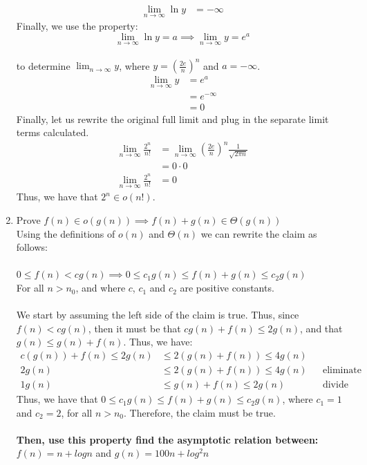 \documentclass{article}
\begin{document}
\begin{enumerate}
\begin{align}
		\lim_{n\to\infty} \ln y &= -\infty
	\end{align}
	Finally, we use the property:
	$$\lim_{n\to\infty} \ln y = a \implies \lim_{n\to\infty} y = e^a$$
	\\ to determine $\lim_{n\to\infty} y$, where $y=(\frac{2e}{n})^n$ and $a=-\infty$.
	\begin{align}
		\lim_{n\to\infty} y &= e^a \\
		&= e^{-\infty} \\
		&= 0
	\end{align}
	Finally, let us rewrite the original full limit and plug in the separate limit terms calculated.
	\begin{align}
		\lim_{n\to\infty} \frac{2^n}{n!} &= \lim_{n\to\infty} (\frac{2e}{n})^n \frac{1}{\sqrt{2\pi n}} \\
		&= 0 \cdot 0 \\
		\lim_{n\to\infty}\frac{2^n}{n!} &= 0
	\end{align}
	Thus, we have that $2^n \in o(n!)$.
	\item Prove $f(n) \in o(g(n)) \implies f(n) + g(n) \in \Theta(g(n))$
	\\ Using the definitions of $o(n)$ and $\Theta(n)$ we can rewrite the claim as follows:
	\\	
	\\$0 \leq f(n) < c g(n) \implies 0 \leq c_1g(n) \leq f(n) + g(n) \leq c_2 g(n)$
	\\ For all $n>n_0$, and where $c$, $c_1$ and $c_2$ are positive constants. 
	\\ \\ We start by assuming the left side of the claim is true. Thus, since $f(n) < cg(n)$, then it must be that $cg(n)+f(n)\leq 2g(n)$, and that $g(n)\leq g(n)+f(n)$. Thus, we have:
	\begin{align}
	c(g(n)) + f(n) \leq 2g(n) &\leq 2(g(n) + f(n))\leq 4g(n) \\
	2g(n) &\leq 2(g(n) + f(n))\leq 4g(n)  && \text{eliminate left-most term}\\
	1g(n) &\leq g(n) + f(n)\leq 2g(n) && \text{divide by 2}
	\end{align}
	Thus, we have that $0 \leq c_1g(n) \leq f(n) + g(n) \leq c_2 g(n)$, where $c_1=1$ and $c_2=2$, for all $n>n_0$. Therefore, the claim must be true. 
	\\ \\ \textbf{Then, use this property find the asymptotic relation between:} 
	\\$f(n) = n+logn$ and $g(n) = 100n + log^2n$

\end{enumerate}
\end{document}
